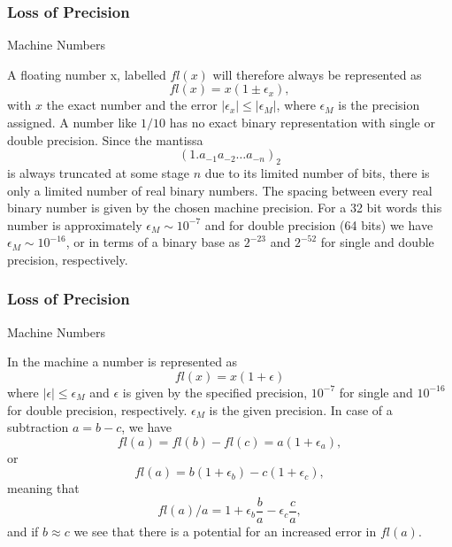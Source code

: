 \documentclass[compress]{beamer}
\begin{document}
\frame
{
  \frametitle{Loss of Precision}
  \begin{block}{Machine Numbers}
\begin{small}
{\scriptsize
A floating number x, labelled $fl(x)$ will therefore always be represented as
\begin{equation}
  fl(x) = x(1\pm \epsilon_x),
\end{equation}
with $x$ the exact number and the error $|\epsilon_x| \le |\epsilon_M|$, where
$\epsilon_M$ is the precision assigned. A number like $1/10$ has no exact binary representation
with single or double precision. Since the mantissa
\[
\left(1.a_{-1}a_{-2}\dots a_{-n}\right)_2
\]
is always truncated at some stage $n$ due to its limited number of bits, there is only a
limited number of real binary numbers. The spacing between every real binary number is given by the
chosen machine precision.
For a 32 bit words this number is approximately
$ \epsilon_M \sim 10^{-7}$ and for double precision (64 bits) we have
$ \epsilon_M \sim 10^{-16}$, or in terms of a binary base
as $2^{-23}$ and $2^{-52}$ for single and double precision, respectively.
}
\end{small}
  \end{block}
}




\frame
{
  \frametitle{Loss of Precision}
  \begin{block}{Machine Numbers}
\begin{small}
{\scriptsize
In the machine a number is represented as
\begin{equation}
  fl(x)= x(1+\epsilon)
\end{equation}
%
where $|\epsilon| \leq \epsilon_M$ and $\epsilon$ is given by the
specified precision, $10^{-7}$ for single and $10^{-16}$ for double
precision, respectively.
$\epsilon_M$ is the given precision.
In case of a subtraction $a=b-c$, we have
\begin{equation}
   fl(a)=fl(b)-fl(c) = a(1+\epsilon_a),
\end{equation}
or
%
\begin{equation}
   fl(a)=b(1+\epsilon_b)-c(1+\epsilon_c),
\end{equation}
%
meaning that
%
\begin{equation}
   fl(a)/a=1+\epsilon_b\frac{b}{a}- \epsilon_c\frac{c}{a},
\end{equation}
%
and if $b\approx c$ we see that there is a potential for an increased
error in $fl(a)$.
}
\end{small}
  \end{block}
}
\end{document}
